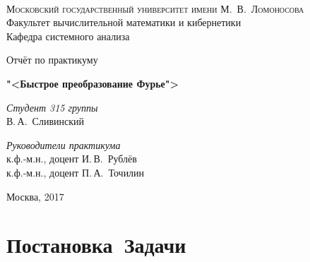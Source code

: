 \documentclass[11pt, oneside, draft]{extreport}
\begin{document}
\thispagestyle{empty}

\begin{center}
\ \vspace{-3cm}

{\scshape Московский государственный университет имени М.~В.~Ломоносова}\\
Факультет вычислительной математики и кибернетики\\
Кафедра системного анализа

\vfill

{\LARGE Отчёт по практикуму}

\vspace{1cm}

{\Huge\bfseries "<Быстрое преобразование Фурье">}
\end{center}

\vspace{1cm}

\begin{flushright}
  \large
  \textit{Студент 315 группы}\\
  В.\,А.~Сливинский

  \vspace{5mm}

  \textit{Руководители практикума}\\
  к.ф.-м.н., доцент И.\,В.~Рублёв \\
    к.ф.-м.н., доцент П.\,А.~Точилин
\end{flushright}

\vfill

\begin{center}
Москва, 2017
\end{center}
\pagebreak
\section{Постановка~Задачи}
\end{document}
